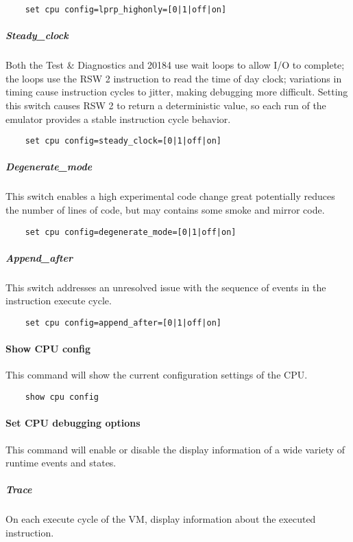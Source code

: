 \documentclass[notitlepage]{report}
\begin{document}
\begin{lstlisting}
	set cpu config=lprp_highonly=[0|1|off|on]
\end{lstlisting}

\subparagraph{Steady\_clock}
Both the Test \& Diagnostics and 20184 use wait loops to allow I/O to complete; the loops use the RSW 2 instruction to read the time of day clock; variations in timing cause instruction cycles to jitter, making debugging more difficult. Setting this switch causes RSW 2 to return a deterministic value, so each run of the emulator provides a stable instruction cycle behavior.

\begin{lstlisting}
	set cpu config=steady_clock=[0|1|off|on]
\end{lstlisting}

\subparagraph{Degenerate\_mode}
This switch enables a high experimental code change great potentially reduces the number of lines of code, but may contains some smoke and mirror code.

\begin{lstlisting}
	set cpu config=degenerate_mode=[0|1|off|on]
\end{lstlisting}

\subparagraph{Append\_after}
This switch addresses an unresolved issue with the sequence of events in the instruction execute cycle.

\begin{lstlisting}
	set cpu config=append_after=[0|1|off|on]
\end{lstlisting}

\paragraph{Show CPU config}
This command will show the current configuration settings of the CPU.

\begin{lstlisting}
	show cpu config
\end{lstlisting}

\paragraph{Set CPU debugging options}
This command will enable or disable the display information of a wide variety of runtime events and states.

\subparagraph{Trace}
On each execute cycle of the VM, display information about the executed instruction.
\end{document}
